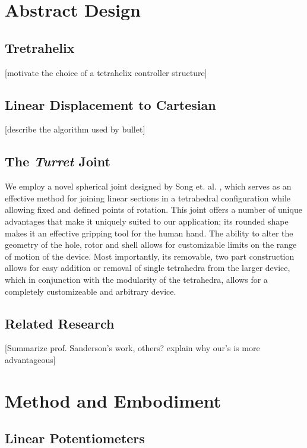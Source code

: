 \documentclass[11pt]{article}
\begin{document}
\section{Abstract Design}
\subsection{Tretrahelix}

[motivate the choice of a tetrahelix controller structure]


\subsection{Linear Displacement to Cartesian}

[describe the algorithm used by bullet]
           
\subsection{The \textit{Turret} Joint}

We employ a novel spherical joint designed by Song et. al. \cite{song2003spherical}, which serves as an effective method for joining linear sections in a tetrahedral configuration while allowing fixed and defined points of rotation. This joint offers a number of unique advantages that make it uniquely suited to our application; its rounded shape makes it an effective gripping tool for the human hand. The ability to alter the geometry of the hole, rotor and shell allows for customizable limits on the range of motion of the device. Most importantly, its removable, two part construction allows for easy addition or removal of single tetrahedra from the larger device, which in conjunction with the modularity of the tetrahedra, allows for a completely customizeable and arbitrary device.
\subsection{Related Research}

[Summarize prof. Sanderson's work, others? explain why our's is more advantageous]

\section{Method and Embodiment}

\subsection{Linear Potentiometers}
\end{document}
